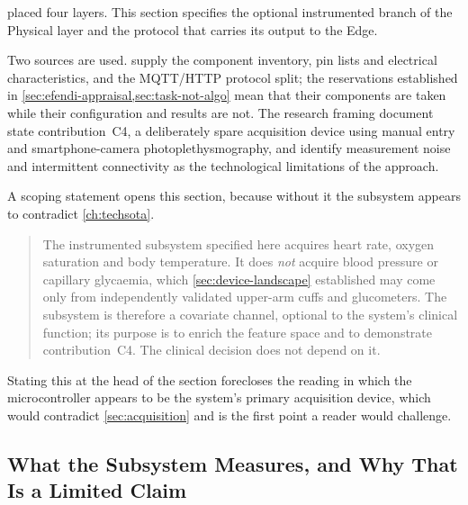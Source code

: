 \documentclass[12pt,a4paper,oneside]{report}
\begin{document}
 placed four layers. This section specifies the optional instrumented branch of the Physical layer and the protocol that carries its output to the Edge.

Two sources are used. \Textcite{efendi2025} supply the component inventory, pin lists and electrical characteristics, and the MQTT/HTTP protocol split; the reservations established in \cref{sec:efendi-appraisal,sec:task-not-algo} mean that their components are taken while their configuration and results are not. The research framing document state contribution~C4, a deliberately spare acquisition device using manual entry and smartphone-camera photoplethysmography, and identify measurement noise and intermittent connectivity as the technological limitations of the approach.

A scoping statement opens this section, because without it the subsystem appears to contradict \cref{ch:techsota}.

\begin{quote}
The instrumented subsystem specified here acquires heart rate, oxygen saturation and body temperature. It does \emph{not} acquire blood pressure or capillary glycaemia, which \cref{sec:device-landscape} established may come only from independently validated upper-arm cuffs and glucometers. The subsystem is therefore a covariate channel, optional to the system's clinical function; its purpose is to enrich the feature space and to demonstrate contribution~C4. The clinical decision does not depend on it.
\end{quote}

Stating this at the head of the section forecloses the reading in which the microcontroller appears to be the system's primary acquisition device, which would contradict \cref{sec:acquisition} and is the first point a reader would challenge.

\subsection{What the Subsystem Measures, and Why That Is a Limited Claim}\label{sec:measures}
\end{document}
